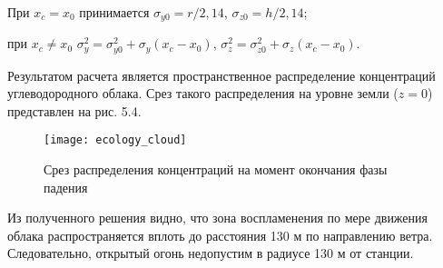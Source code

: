 При $x_c = x_0$ принимается $\sigma_{y0}=r/2,14$, $\sigma_{z0}=h/2,14$; 

при $x_c \neq x_0$ $\sigma_y^2 = \sigma_{y0}^2 + \sigma_y(x_c - x_0)$, $\sigma_z^2 = \sigma_{z0}^2 + \sigma_z(x_c - x_0)$.

Результатом расчета является пространственное распределение концентраций углеводородного облака. Срез такого распределения на уровне земли ($z=0$) представлен на рис. 5.4.

\begin{figure}[H]
	\centering
	\texttt{[image: ecology\_cloud]}
	\caption{Срез распределения концентраций на момент окончания фазы падения}
\end{figure} 

Из полученного решения видно, что зона воспламенения по мере движения облака распространяется вплоть до расстояния 130 м по направлению ветра. Следовательно, открытый огонь недопустим в радиусе 130 м от станции.
